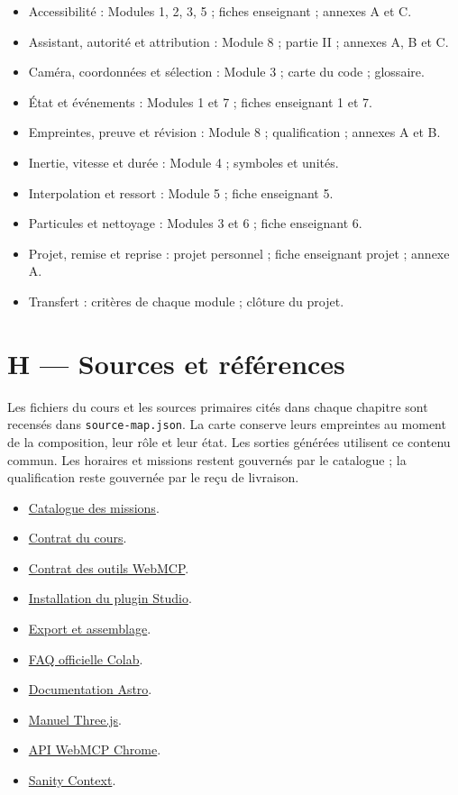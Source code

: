\documentclass[
  canadien,
  11pt,
  a4paper,
]{report}
\providecommand{\tightlist}{%
  \setlength{\itemsep}{0pt}\setlength{\parskip}{0pt}}
\begin{document}
\begin{itemize}
\tightlist
\item
  Accessibilité : Modules 1, 2, 3, 5 ; fiches enseignant ; annexes A et
  C.
\item
  Assistant, autorité et attribution : Module 8 ; partie II ; annexes A,
  B et C.
\item
  Caméra, coordonnées et sélection : Module 3 ; carte du code ;
  glossaire.
\item
  État et événements : Modules 1 et 7 ; fiches enseignant 1 et 7.
\item
  Empreintes, preuve et révision : Module 8 ; qualification ; annexes A
  et B.
\item
  Inertie, vitesse et durée : Module 4 ; symboles et unités.
\item
  Interpolation et ressort : Module 5 ; fiche enseignant 5.
\item
  Particules et nettoyage : Modules 3 et 6 ; fiche enseignant 6.
\item
  Projet, remise et reprise : projet personnel ; fiche enseignant projet
  ; annexe A.
\item
  Transfert : critères de chaque module ; clôture du projet.
\end{itemize}

\section{H --- Sources et
références}\label{h-sources-et-ruxe9fuxe9rences}

Les fichiers du cours et les sources primaires cités dans chaque
chapitre sont recensés dans \texttt{source-map.json}. La carte conserve
leurs empreintes au moment de la composition, leur rôle et leur état.
Les sorties générées utilisent ce contenu commun. Les horaires et
missions restent gouvernés par le catalogue ; la qualification reste
gouvernée par le reçu de livraison.

\begin{itemize}
\tightlist
\item
  \href{../../../../../packages/learning/src/catalog.ts}{Catalogue des
  missions}.
\item
  \href{../../FORMATION_CONTRACT.md}{Contrat du cours}.
\item
  \href{../../WEBMCP.md}{Contrat des outils WebMCP}.
\item
  \href{../../STUDIO_INSTALLATION.md}{Installation du plugin Studio}.
\item
  \href{../../assembly/README.md}{Export et assemblage}.
\item
  \href{https://research.google.com/colaboratory/faq.html}{FAQ
  officielle Colab}.
\item
  \href{https://docs.astro.build/en/basics/astro-components/}{Documentation
  Astro}.
\item
  \href{https://threejs.org/manual/\#en/fundamentals}{Manuel Three.js}.
\item
  \href{https://developer.chrome.com/docs/ai/webmcp/imperative-api}{API
  WebMCP Chrome}.
\item
  \href{https://www.sanity.io/docs/ai/sanity-context}{Sanity Context}.
\end{itemize}
\end{document}
